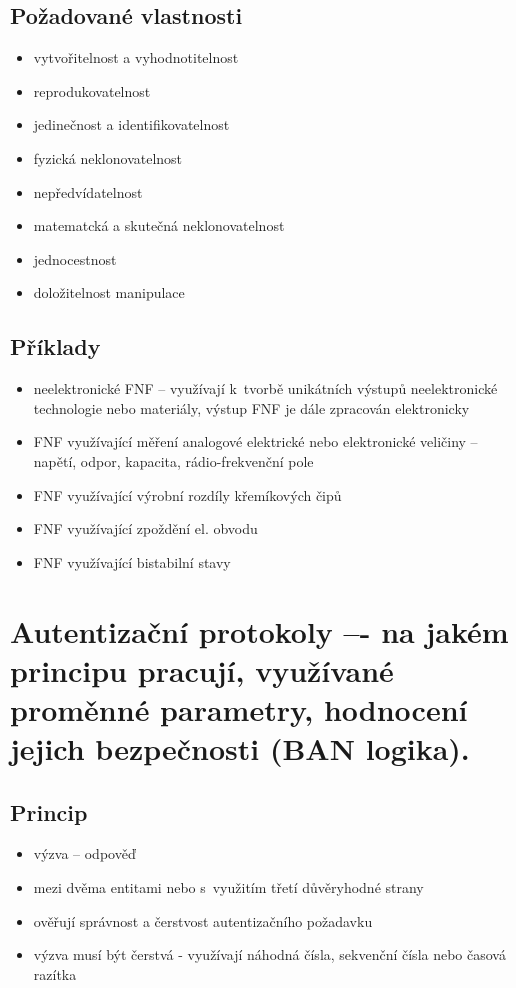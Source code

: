 \subsection{Požadované vlastnosti}
\begin{itemize}
    \item vytvořitelnost a vyhodnotitelnost
    \item reprodukovatelnost
    \item jedinečnost a identifikovatelnost
    \item fyzická neklonovatelnost
    \item nepředvídatelnost
    \item matematcká a skutečná neklonovatelnost
    \item jednocestnost
    \item doložitelnost manipulace
\end{itemize}

\subsection{Příklady}
\begin{itemize}
    \item neelektronické FNF -- využívají k~tvorbě unikátních výstupů neelektronické technologie nebo materiály, výstup FNF je dále zpracován elektronicky
    \item FNF využívající měření analogové elektrické nebo elektronické veličiny -- napětí, odpor, kapacita, rádio-frekvenční pole
    \item FNF využívající výrobní rozdíly křemíkových čipů
    \item FNF využívající zpoždění el. obvodu
    \item FNF využívající bistabilní stavy
\end{itemize}

\clearpage
\section{Autentizační protokoly –- na jakém principu pracují, využívané proměnné parametry, hodnocení jejich bezpečnosti (BAN logika).}
\subsection{Princip}
\begin{itemize}
    \item výzva -- odpověď
    \item mezi dvěma entitami nebo s~využitím třetí důvěryhodné strany
    \item ověřují správnost a čerstvost autentizačního požadavku
    \item výzva musí být čerstvá - využívají náhodná čísla, sekvenční čísla nebo časová razítka
\end{itemize}

